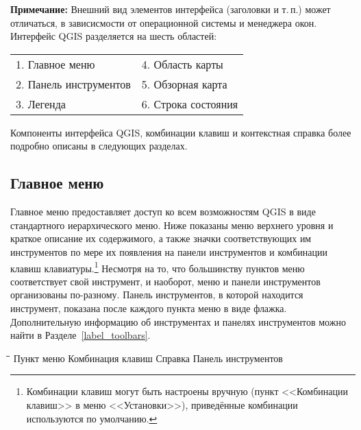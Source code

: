 \textbf{Примечание:} Внешний вид элементов интерфейса (заголовки
и т.\,п.) может отличаться, в зависисмости от операционной системы и
менеджера окон.\\

Интерфейс QGIS разделяется на шесть областей:

\begin{tabular}{p{5cm} p{5cm}}
1. Главное меню & 4. Область карты \\
2. Панель инструментов & 5. Обзорная карта \\
3. Легенда & 6. Строка состояния \\
\end{tabular}

Компоненты интерфейса QGIS, комбинации клавиш и контекстная справка более
подробно описаны в следующих разделах.

\subsection{Главное меню}\label{label_menubar}

Главное меню предоставляет доступ ко всем возможностям QGIS в виде
стандартного иерархического меню. Ниже показаны меню верхнего уровня
и краткое описание их содержимого, а также значки соответствующих им
инструментов по мере их появления на панели инструментов и комбинации
клавиш клавиатуры.\footnote{Комбинации клавиш могут быть настроены вручную (пункт
<<Комбинации клавиш>> в меню <<Установки>>), приведённые комбинации используются
по умолчанию.}
Несмотря на то, что большинству пунктов меню соответствует свой инструмент,
и наоборот, меню и панели инструментов организованы по-разному.
Панель инструментов, в которой находится инструмент, показана после каждого
пункта меню в виде флажка. Дополнительную информацию об инструментах
и панелях инструментов можно найти в Разделе~\ref{label_toolbars}.

\begin{tabbing}
\hspace{5.5cm}\=\hspace{3cm}\=\hspace{3.5cm}\= \kill
\hspace{1cm} Пункт меню \> Комбинация клавиш \> Справка \> Панель инструментов\\
\end{tabbing}

